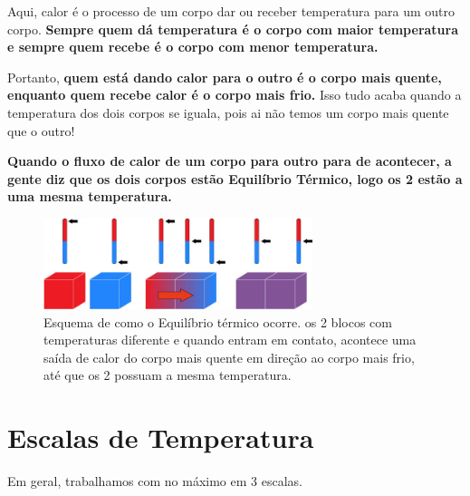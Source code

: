 \documentclass[12pt]{extarticle}
\newcommand{\<}{\langle}
\renewcommand{\>}{\rangle}
\theoremstyle{definition}
\begin{document}
    Aqui, calor é o processo de um corpo dar ou receber temperatura para um outro corpo. \textbf{Sempre quem dá temperatura é o corpo com maior temperatura e sempre quem recebe é o corpo com menor temperatura.}
    
    Portanto, \textbf{quem está dando calor para o outro é o corpo mais quente, enquanto quem recebe calor é o corpo mais frio.} Isso tudo acaba quando a temperatura dos dois corpos se iguala, pois ai não temos um corpo mais quente que o outro!
    
    \textbf{Quando o fluxo de calor de um corpo para outro para de acontecer, a gente diz que os dois corpos estão Equilíbrio Térmico, logo os 2 estão a uma mesma temperatura.}
    
    \begin{figure}[H]
        \centering
        \includegraphics[width=0.7\textwidth]{equilibrio-termico.jpg}
        \caption{Esquema de como o Equilíbrio térmico ocorre. os 2 blocos com temperaturas diferente e quando entram em contato, acontece uma saída de calor do corpo mais quente em direção ao corpo mais frio, até que os 2 possuam a mesma temperatura.}
        \label{fig:exemplo_1}
    \end{figure}
    
    \section{Escalas de Temperatura}
    
    Em geral, trabalhamos com no máximo em 3 escalas.
    
\end{document}
